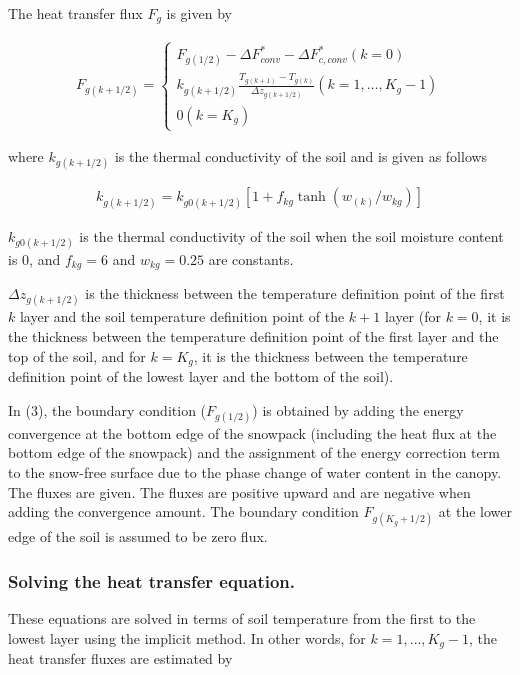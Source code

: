 The heat transfer flux \(F_{g}\) is given by

\begin{eqnarray}
 F_{g(k+1/2)} =
\left\{
\begin{array}{ll}
F_{g(1/2)} - \Delta F_{conv}^* - \Delta F_{c,conv}^*
 (k=0)\\
\displaystyle{
k_{g(k+1/2)} \frac{T_{g(k+1)} - T_{g(k)}}{\Delta z_{g(k+1/2)}}
}
 (k=1,\ldots,K_{g}-1) \\
\displaystyle{
0
}
 (k=K_{g})
\end{array}
\right.
\end{eqnarray}

where \(k_{g(k+1/2)}\) is the thermal conductivity of the soil and is
given as follows

\begin{eqnarray}
 k_{g(k+1/2)} = k_{g0(k+1/2)} [ 1 + f_{kg} \tanh( w_{(k)}/ w_{kg} ) ]
\end{eqnarray}

\(k_{g0(k+1/2)}\) is the thermal conductivity of the soil when the soil
moisture content is \(0\), and \(f_{kg}=6\) and \(w_{kg}=0.25\) are
constants.

\(\Delta z_{g(k+1/2)}\) is the thickness between the temperature
definition point of the first \(k\) layer and the soil temperature
definition point of the \(k+1\) layer (for \(k=0\), it is the thickness
between the temperature definition point of the first layer and the top
of the soil, and for \(k=K_g\), it is the thickness between the
temperature definition point of the lowest layer and the bottom of the
soil).

In (3), the boundary condition (\(F_{g(1/2)}\)) is obtained by adding
the energy convergence at the bottom edge of the snowpack (including the
heat flux at the bottom edge of the snowpack) and the assignment of the
energy correction term to the snow-free surface due to the phase change
of water content in the canopy. The fluxes are given. The fluxes are
positive upward and are negative when adding the convergence amount. The
boundary condition \(F_{g(K_g+1/2)}\) at the lower edge of the soil is
assumed to be zero flux.

\hypertarget{solving-the-heat-transfer-equation.}{%
\subsubsection{Solving the heat transfer
equation.}\label{solving-the-heat-transfer-equation.}}

These equations are solved in terms of soil temperature from the first
to the lowest layer using the implicit method. In other words, for
\(k=1,\ldots,K_g-1\), the heat transfer fluxes are estimated by

